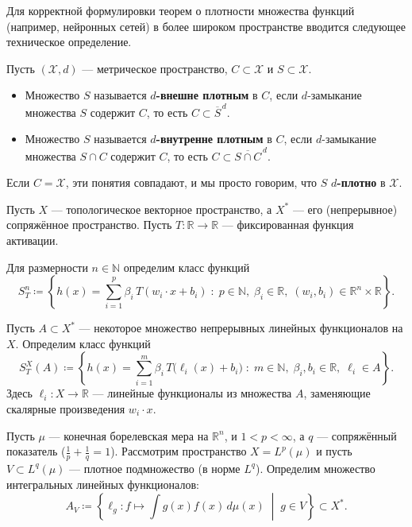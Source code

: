 \documentclass[../NDCNNAI_main.tex]{subfiles}
\begin{document}
Для корректной формулировки теорем о плотности множества функций (например, нейронных сетей) в более широком пространстве вводится следующее техническое определение.

\begin{definition}
Пусть \( (\mathcal{X}, d) \) --- метрическое пространство, \( C \subset \mathcal{X} \) и \( S \subset \mathcal{X} \).
\begin{itemize}
    \item Множество \( S \) называется \textbf{\( d \)-внешне плотным} в \( C \), если \( d \)-замыкание множества \( S \) содержит \( C \), то есть $C \subset \overline{S}^{\,d}$.
    \item Множество \( S \) называется \textbf{\( d \)-внутренне плотным} в \( C \), если \( d \)-замыкание множества \( S \cap C \) содержит \( C \), то есть $C \subset \overline{S \cap C}^{\,d}$.
\end{itemize}
Если \( C = \mathcal{X} \), эти понятия совпадают, и мы просто говорим, что \( S \) \textbf{\( d \)-плотно} в \( \mathcal{X} \).
\end{definition}

Пусть \( X \) --- топологическое векторное пространство, а \( X^* \) --- его (непрерывное) сопряжённое пространство. Пусть \( T\colon \mathbb{R} \to \mathbb{R} \) --- фиксированная функция активации.

\begin{definition}
Для размерности \( n \in \mathbb{N} \) определим класс функций
\[
S_T^n \coloneq \left\{ h(x) = \sum_{i=1}^{p} \beta_i \, T(w_i \cdot x + b_i) \;:\; p \in \mathbb{N},\; \beta_i \in \mathbb{R},\; (w_i, b_i) \in \mathbb{R}^n \times \mathbb{R} \right\}.
\]
\end{definition}

\begin{definition}
Пусть \( A \subset X^* \) --- некоторое множество непрерывных линейных функционалов на \( X \). Определим класс функций
\[
S_T^X(A) \coloneq \left\{ h(x) = \sum_{i=1}^{m} \beta_i \, T\bigl( \ell_i(x) + b_i \bigr) \;:\; m \in \mathbb{N},\; \beta_i, b_i \in \mathbb{R},\; \ell_i \in A \right\}.
\]
Здесь \( \ell_i\colon X \to \mathbb{R} \) --- линейные функционалы из множества \( A \), заменяющие скалярные произведения \( w_i \cdot x \).
\end{definition}

Пусть $\mu$ --- конечная борелевская мера на $\mathbb{R}^n$, и $1 < p < \infty$, а $q$ --- сопряжённый показатель ($\frac{1}{p} + \frac{1}{q} = 1$). Рассмотрим пространство $X = L^p(\mu)$ и пусть $V \subset L^q(\mu)$ --- плотное подмножество (в норме $L^q$). Определим множество интегральных линейных функционалов:
\[
A_V \coloneq \left\{ \ell_g \colon f \mapsto \int g(x)f(x) \, d\mu(x) \; \middle| \; g \in V \right\} \subset X^*.
\]
\end{document}
